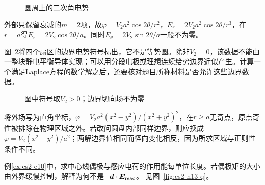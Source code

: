 \begin{figure}[H]\centering
{}
\caption{圆周上的二次角电势}\label{fig:es2-h12-q}
\end{figure}
\begin{solution}
外部只保留衰减的$m=2$项，故$\varphi=V_2a^2\cos2\theta/r^2$，$E_r=2V_2a^2\cos2\theta/r^3$，在$r=a$得$E_r=2V_2\cos2\theta/a$。同时$E_\theta=2V_2\sin2\theta/a$一般不为零。

图~\ref{fig:es2-h12-s}将四个扇区的边界电势符号标出，它不是等势圆。除非$V_2=0$，该数据不能由一整块静电平衡导体实现；可以用分段电极或理想连续给势边界近似产生。计算一个满足Laplace方程的数学解之后，还要核对题目所称材料是否允许这些边界数据。
\begin{figure}[H]\centering
{}
\caption{图中符号取$V_2>0$；边界切向场不为零}\label{fig:es2-h12-s}
\end{figure}


将外场写为直角坐标，$\varphi=V_2a^2(x^2-y^2)/(x^2+y^2)^2$，在$r\ge a$无奇点，原点奇性被排除在物理区域之外。若改问圆盘内部同样边界，则应换成$\varphi=V_2(x^2-y^2)/a^2$；两解边界值相同而径向变化相反，因为所求区域与正则性条件不同。
\end{solution}

\begin{exercise}[线偶极腔的反作用能]\label{ex:es2-h13}
例\ref{ex:es2-e10}中，求中心线偶极与感应电荷的作用能每单位长度。若偶极矩的大小由外界缓慢控制，解释为何不是$-\bm{d}\cdot\bm{E}_{\rm reac}$。 见图~\ref{fig:es2-h13-q}。
\end{exercise}

